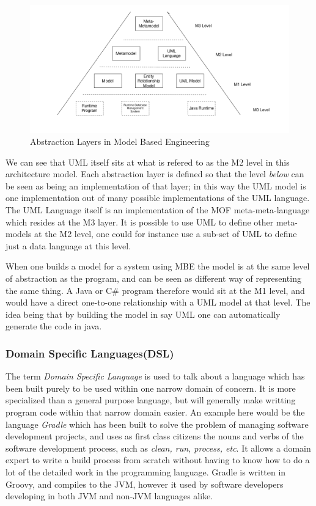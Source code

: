 \documentclass{llncs}
\begin{document}
\begin{figure}[h]
\includegraphics[width=1.0\textwidth,natwidth=610,natheight=642]{Models1}
\caption{Abstraction Layers in Model Based Engineering} 
\label{fig:mbe1}
\end{figure}

We can see that UML itself sits at what is refered to as the M2 level in this architecture model. Each abstraction layer is defined so that the level \emph{below} can be seen as being an implementation of that layer; in this way the UML model is one implementation out of many possible implementations of the UML language. The UML Language itself is an implementation of the MOF meta-meta-language which resides at the M3 layer. It is possible to use UML to define other meta-models at the M2 level, one could for instance use a sub-set of UML to define just a data language at this level.

When one builds a model for a system using MBE the model is at the same level of abstraction as the program, and can be seen as different way of representing the same thing.  A Java or C\# program therefore would sit at the M1 level, and would have a direct one-to-one relationship with a UML model at that level. The idea being that by building the model in say UML one can automatically generate the code in java.

\subsubsection{Domain Specific Languages(DSL)}
The term \emph{Domain Specific Language} is used to talk about a language which has been built purely to be used within one narrow domain of concern. It is more specialized than a general purpose language, but will generally make writting program code within that narrow domain easier.  An example here would be the language \emph{Gradle} which has been built to solve the problem of managing software development projects, and uses as first class citizens the nouns and verbs of the software development process, such as \emph{clean, run, process, etc}. It allows a domain expert to write a build process from scratch without having to know how to do a lot of the detailed work in the programming language. Gradle is written in Groovy, and compiles to the JVM, however it used by software developers developing in both JVM and non-JVM languages alike.
\end{document}
